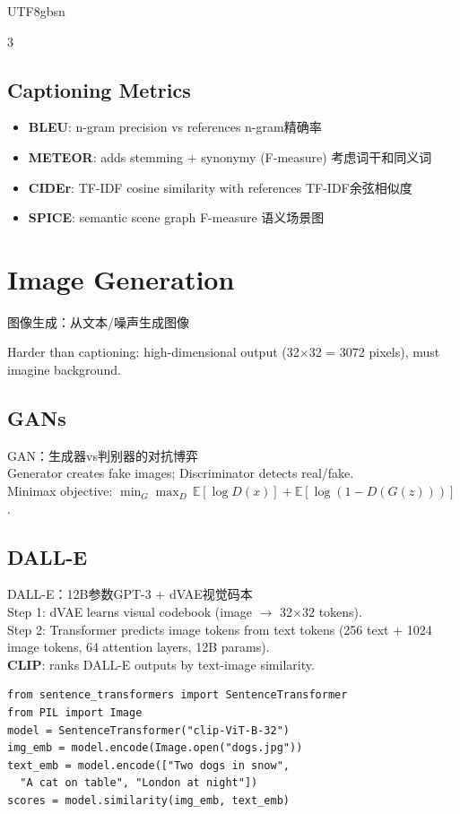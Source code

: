 \documentclass[9pt,landscape,a4paper]{article}
\newcommand{\zhint}[1]{{\scriptsize\color{gray!70!black}#1}}
\begin{document}
\begin{CJK}{UTF8}{gbsn}
\begin{multicols}{3}
\subsection{Captioning Metrics}
\begin{itemize}[leftmargin=8pt,itemsep=0pt,topsep=0pt]
\item \textbf{BLEU}: n-gram precision vs references \zhint{n-gram精确率}
\item \textbf{METEOR}: adds stemming + synonymy (F-measure) \zhint{考虑词干和同义词}
\item \textbf{CIDEr}: TF-IDF cosine similarity with references \zhint{TF-IDF余弦相似度}
\item \textbf{SPICE}: semantic scene graph F-measure \zhint{语义场景图}
\end{itemize}

\section{Image Generation}
\zhint{图像生成：从文本/噪声生成图像}

Harder than captioning: high-dimensional output (32$\times$32 = 3072 pixels), must imagine background.

\subsection{GANs}
\zhint{GAN：生成器vs判别器的对抗博弈}\\
Generator creates fake images; Discriminator detects real/fake.\\
Minimax objective: $\min_G \max_D \, \mathbb{E}[\log D(x)] + \mathbb{E}[\log(1-D(G(z)))]$.

\subsection{DALL-E}
\zhint{DALL-E：12B参数GPT-3 + dVAE视觉码本}\\
Step 1: dVAE learns visual codebook (image $\to$ 32$\times$32 tokens).\\
Step 2: Transformer predicts image tokens from text tokens (256 text + 1024 image tokens, 64 attention layers, 12B params).\\
\textbf{CLIP}: ranks DALL-E outputs by text-image similarity.
\begin{lstlisting}
from sentence_transformers import SentenceTransformer
from PIL import Image
model = SentenceTransformer("clip-ViT-B-32")
img_emb = model.encode(Image.open("dogs.jpg"))
text_emb = model.encode(["Two dogs in snow",
  "A cat on table", "London at night"])
scores = model.similarity(img_emb, text_emb)
\end{lstlisting}


\end{multicols}
\end{CJK}
\end{document}
